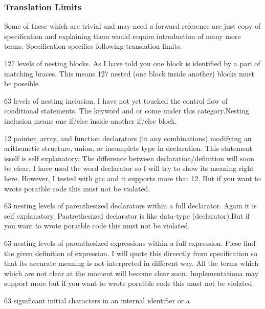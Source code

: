 \subsubsection{Translation Limits}
Some of these which are trivial and may need a forward reference are
just copy of specification and explaining them would require
introduction of many more terms. Specification specifies following
translation limits.
\startitemize[n]
\item 127 levels of nesting blocks. As I have told you one block is
  identified by a pari of matching braces. This means 127 nested (one
  block inside another) blocks must be possible.
\item 63 levels of nesting inclusion. I have not yet touched the
  control flow of conditional statements. The keyword  and
     or  come under this category.Nesting
    inclusion means one if/else inside another if/else block.
\item 12 pointer, array, and function declarators (in any
  combinations) modifying an arithemetic structure, union, or
  incomplete type in declaration. This statement isself is self
  explanatory. The difference between declaration/definition will soon
  be clear. I have used the word declarator so I will try to show its
  meaning right here.  However, I
  tested with gcc and it supports more that 12. But if you want to
  wrote poratble code this must not be violated.
\item 63 nesting levels of parenthesized declarators within a full
  declarator. Again it is self explanatory. Paatrethesized declarator
  is like data-type (declarator).But if you want to wrote poratble
  code this must not be violated.
\item 63 nesting levels of parenthesized expressions within a full
  expression. Plese find the given definition of expression. I will
  quote this direectly from specification so that its accurate meaning
  is not interpreted in different way.  All the
  terms which which are not clear at the moment will become clear
  soon. Implementationa may support more but if you want to
  wrote poratble code this must not be violated.
\item 63 significant initial characters in an internal identifier or a
